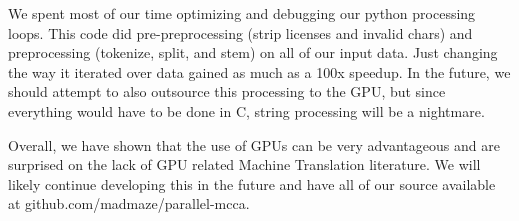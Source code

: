 \documentclass[12pt]{article}
\begin{document}
We spent most of our time optimizing and debugging our python processing loops. This code did pre-preprocessing (strip licenses and invalid chars) and preprocessing (tokenize, split, and stem) on all of our input data. Just changing the way it iterated over data gained as much as a 100x speedup. In the future, we should attempt to also outsource this processing to the GPU, but since everything would have to be done in C, string processing will be a nightmare.

Overall, we have shown that the use of GPUs can be very advantageous and are surprised on the lack of GPU related Machine Translation literature. We will likely continue developing this in the future and have all of our source available at github.com/madmaze/parallel-mcca.



\end{document}
